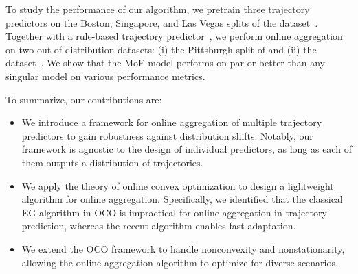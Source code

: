 To study the performance of our algorithm, we pretrain three trajectory predictors on the Boston, Singapore, and Las Vegas splits of the \nuscenes dataset~\cite{caesar2020nuscenes}. Together with a rule-based trajectory predictor~\cite{veer23arxiv-mpf}, we perform online aggregation on two out-of-distribution datasets: (i) the Pittsburgh split of \nuscenes and (ii) the \lyft dataset~\cite{houston2021one}. We show that the MoE model performs on par or better than any singular model on various performance metrics. 

To summarize, our contributions are:
\begin{itemize}
    \item We introduce a framework for online aggregation of multiple trajectory predictors to gain robustness against distribution shifts. Notably, our framework is agnostic to the design of individual predictors, as long as each of them outputs a distribution of trajectories.

    \item We apply the theory of online convex optimization to design a lightweight algorithm for online aggregation. Specifically, we identified that the classical EG algorithm in OCO is impractical for online aggregation in trajectory prediction, whereas the recent \squint algorithm enables fast adaptation.
    
    \item We extend the OCO framework to handle nonconvexity and nonstationarity, allowing the online aggregation algorithm to optimize for diverse scenarios.
\end{itemize}
